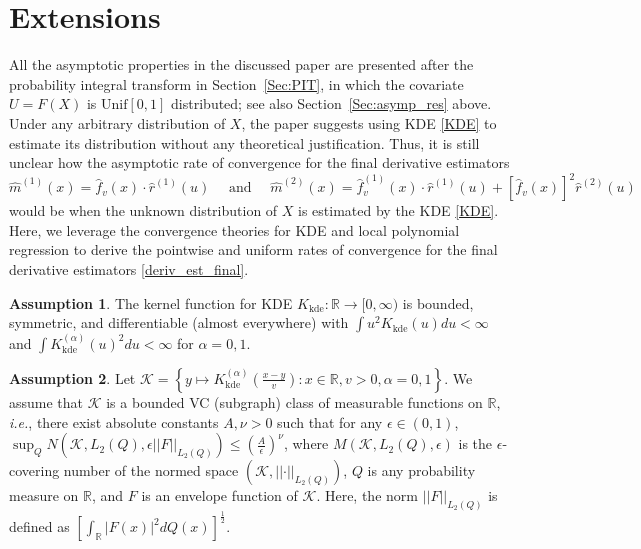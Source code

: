\documentclass{uwstat572}
\theoremstyle{definition}
\newtheorem{assump}{Assumption}
\newcommand{\norm}[1]{\left|\left| #1 \right|\right|}
\renewcommand{\hat}{\widehat}
\theoremstyle{theorem}
\begin{document}
\section{Extensions}
\label{Sec:extension}

All the asymptotic properties in the discussed paper \citep{liu2020smoothed} are presented after the probability integral transform in Section~\ref{Sec:PIT}, in which the covariate $U=F(X)$ is $\mathrm{Unif}[0,1]$ distributed; see also Section~\ref{Sec:asymp_res} above. Under any arbitrary distribution of $X$, the paper suggests using KDE \eqref{KDE} to estimate its distribution without any theoretical justification. Thus, it is still unclear how the asymptotic rate of convergence for the final derivative estimators
\begin{equation}
\label{deriv_est_final}
\hat{m}^{(1)}(x) = \hat{f}_v(x) \cdot \hat{r}^{(1)}(u) \quad \text{ and }\quad \hat{m}^{(2)}(x) = \hat{f}_v^{(1)}(x) \cdot \hat{r}^{(1)}(u) + \left[\hat{f}_v(x)\right]^2 \hat{r}^{(2)}(u)
\end{equation} 
would be when the unknown distribution of $X$ is estimated by the KDE \eqref{KDE}. Here, we leverage the convergence theories for KDE \citep{gine2002rates,Einmahl2005uniform,chacon2011asymptotics} and local polynomial regression \citep{francisco2003uniform} to derive the pointwise and uniform rates of convergence for the final derivative estimators \eqref{deriv_est_final}. 
\begin{assump}
\label{assump:kernel_KDE}
The kernel function for KDE $K_{\text{kde}}:\mathbb{R}\to [0,\infty)$ is bounded, symmetric, and differentiable (almost everywhere) with $\int u^2 K_{\text{kde}}(u) du<\infty$ and $\int K_{\text{kde}}^{(\alpha)}(u)^2 du < \infty$ for $\alpha=0,1$.
\end{assump}
\begin{assump}
\label{assump:kernel_VC}
Let $\mathcal{K} = \left\{y\mapsto K_{\text{kde}}^{(\alpha)}\left(\frac{x-y}{v}\right): x\in \mathbb{R}, v>0, \alpha=0,1 \right\}$. We assume that $\mathcal{K}$ is a bounded VC (subgraph) class of measurable functions on $\mathbb{R}$, \emph{i.e.}, there exist absolute constants $A,\nu >0$ such that for any $\epsilon\in (0,1)$, 
$\sup_Q N\left(\mathcal{K}, L_2(Q), \epsilon\norm{F}_{L_2(Q)}\right) \leq \left(\frac{A}{\epsilon}\right)^{\nu}$, where $M\left(\mathcal{K}, L_2(Q), \epsilon\right)$ is the $\epsilon$-covering number of the normed space $\left(\mathcal{K}, \norm{\cdot}_{L_2(Q)}\right)$, $Q$ is any probability measure on $\mathbb{R}$, and $F$ is an envelope function of $\mathcal{K}$. Here, the norm $\norm{F}_{L_2(Q)}$ is defined as $\left[\int_{\mathbb{R}} |F(x)|^2 dQ(x)\right]^{\frac{1}{2}}$.
\end{assump}
\end{document}
